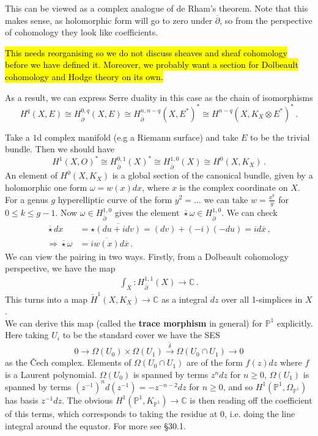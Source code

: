 \documentclass{article}
\begin{document}
\begin{remark}
	This can be viewed as a complex analogue of de Rham's theorem. Note that this makes sense, as holomorphic form will go to zero under $\overline{\partial}$, so from the perspective of cohomology they look like coefficients.  
\end{remark}
\begin{remark}
	\hl{This needs reorganising so we do not discuss sheaves and sheaf cohomology before we have defined it. Moreover, we probably want a section for Dolbeault cohomology and Hodge theory on its own. }
\end{remark}
As a result, we can express Serre duality in this case as the chain of isomorphisms 
\[
H^q(X,E) \cong H^{0,q}_{\overline{\partial}}(X,E) \cong H^{n,n-q}_{\overline{\partial}}(X,E^\ast)^\ast \cong H^{n-q}(X,K_X \otimes E^\ast)^\ast \, .
\]
\begin{example}
	Take a $1$d complex manifold (e.g a Riemann surface) and take $E$ to be the trivial bundle. Then we should have 
	\[
	H^1(X,O)^\ast \cong H^{0,1}_{\overline{\partial}}(X)^\ast \cong H^{1,0}_{\overline{\partial}}(X) \cong H^0(X,K_X) \, .
	\]
	An element of $H^0(X,K_X)$ is a global section of the canonical bundle, given by a holomorphic one form $\omega = w(x)dx$, where $x$ is the complex coordinate on $X$. For a genus $g$ hyperelliptic curve of the form $y^2=\dots$ we can take $w = \frac{x^k}{y}$ for $0 \leq k \leq g-1$. Now $\omega \in H^{1,0}_{\overline{\partial}}$ gives the element $\overline{\star}\omega \in H^{1,0}_{\overline{\partial}}$. We can check 
	\begin{align*}
	\overline{\star} dx &= \star\overline{(du+idv)} = (dv)+(-i)(-du) = id\overline{x} \, , \\
	\Rightarrow \overline{\star} \omega &= i\overline{w(x)} d\overline{x} \, .
	\end{align*}
We can view the pairing in two ways. Firstly, from a Dolbeault cohomology perspective, we have the map 
\begin{align*}
 \int_X : H^{1,1}_{\overline{\partial}}(X) \to \mathbb{C} \, .
\end{align*} 
This turns into a map $\check{H}^1(X,K_X) \to \mathbb{C}$ as a integral $dz$ over all 1-simplices in $X$. \\
We can derive this map (called the \textbf{trace morphism} in general) for $\mathbb{P}^1$ explicitly. Here taking $U_i$ to be the standard cover we have the SES
\[
0 \to \Omega(U_0) \times \Omega(U_1) \overset{\check{\delta}}{\to} \Omega(U_0 \cap U_1) \to 0
\] 
as the \v{C}ech complex. Elements of $\Omega(U_0 \cap U_1)$ are of the form $f(z)dz$ where $f$ is a Laurent polynomial. $\Omega(U_0)$ is spanned by terms $z^n dz$ for $n \geq 0$, $\Omega(U_1)$ is spanned by terms $(z^{-1})^n d(z^{-1}) = -z^{-n-2} dz$ for $n \geq 0$, and so $H^1(\mathbb{P}^1,\Omega_{\mathbb{P}^1})$ has basis $z^{-1}dz$. The obvious $H^1(\mathbb{P}^1,K_{\mathbb{P}^1}) \to \mathbb{C}$ is then reading off the coefficient of this terms, which corresponds to taking the residue at $0$, i.e. doing the line integral around the equator. For more see \cite{Vakil2010} \S 30.1.    
\end{example}
\end{document}
